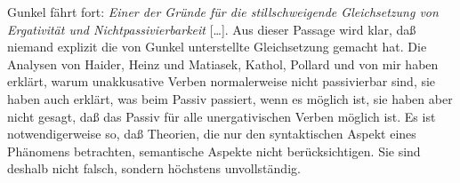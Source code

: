 Gunkel fährt fort: \emph{Einer der Gründe für die stillschweigende Gleichsetzung von Ergativität und
  Nichtpassivierbarkeit} [\ldots].
Aus dieser Passage wird klar, daß niemand explizit die von Gunkel unterstellte Gleichsetzung gemacht hat.
Die Analysen von Haider, Heinz und Matiasek, Kathol, Pollard und von mir haben erklärt, warum
unakkusative Verben normalerweise nicht 
passivierbar sind, sie haben auch erklärt, 
was beim Passiv passiert, wenn es möglich ist, sie haben aber nicht gesagt,
daß das Passiv für alle unergativischen Verben möglich ist. Es ist notwendigerweise so, daß Theorien, die nur den
syntaktischen Aspekt eines Phänomens betrachten, semantische Aspekte nicht berücksichtigen. Sie sind
deshalb nicht falsch, sondern höchstens unvollständig. 







\label{lastpage}
